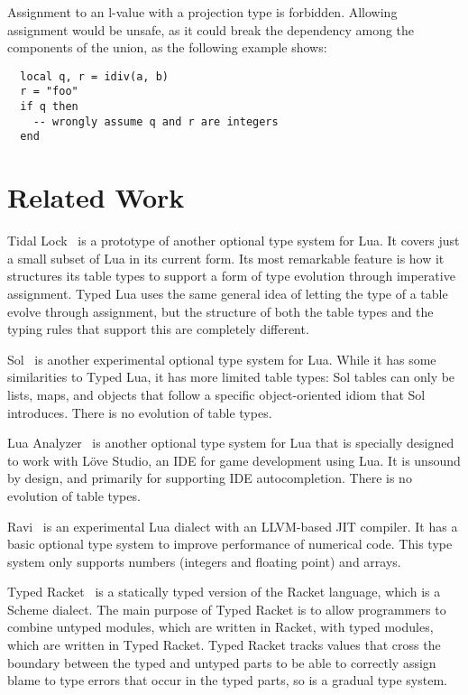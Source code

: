 \documentclass{sigplanconf}
\begin{document}
Assignment to an l-value with a projection type is forbidden. Allowing assignment
would be unsafe, as it could break the dependency among the
components of the union, as the following example shows:
\begin{verbatim}
  local q, r = idiv(a, b)
  r = "foo"
  if q then
    -- wrongly assume q and r are integers
  end
\end{verbatim}

\section{Related Work}
\label{sec:related}

Tidal Lock~\cite{tidallock} is a prototype of another optional type system for Lua. It covers just a small subset of Lua
in its current form. Its most remarkable feature is
how it structures its table types to support a form of type
evolution through imperative assignment. Typed Lua uses
the same general idea of letting the type of a table evolve
through assignment, but the structure of both the table types
and the typing rules that support this are completely different.

Sol~\cite{sol} is another experimental optional type system
for Lua. While it has some similarities to Typed Lua, it
has more limited table types: Sol tables can only be lists,
maps, and objects that follow a specific object-oriented
idiom that Sol introduces. There is no evolution of table
types.

Lua Analyzer~\cite{luaanalyzer} is another optional type
system for Lua that is specially designed to work with
Löve Studio, an IDE for game development using Lua.
It is unsound by design, and primarily for supporting
IDE autocompletion. There is no evolution of table types.

Ravi~\cite{ravi} is an experimental Lua dialect
with an LLVM-based JIT compiler. It has a basic
optional type system to improve performance
of numerical code. This type system only supports
numbers (integers and floating point) and arrays.

Typed Racket~\cite{tobin-hochstadt2008ts} is a statically typed version of the Racket language, which is a Scheme dialect.
The main purpose of Typed Racket is to allow programmers to combine untyped modules, which are written in Racket, with typed modules, which are written in Typed Racket. Typed Racket tracks
values that cross the boundary between the typed and
untyped parts to be able to correctly assign blame to type
errors that occur in the typed parts, so is a gradual type
system.
\end{document}
